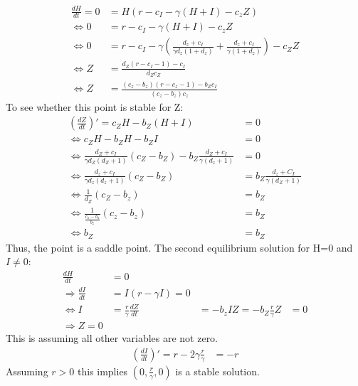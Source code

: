 \documentclass[
	12pt
]{article}
\begin{document}
			\begin{align*}
				\frac{dH}{dt} = 0 &= H(r-c_I-\gamma(H+I)-c_zZ) \\
				\Leftrightarrow 0&= r-c_I -\gamma (H+I)-c_z Z\\
				\Leftrightarrow 0 &= r-c_I - \gamma \left( \frac{d_z +c_I}{\gamma d_z(1+d_z)} +  \frac{d_z +c_I}{\gamma (1+d_z)} \right) - c_Z Z \\
				\Leftrightarrow Z &= \frac{d_Z(r-c_I-1)-c_I}{d_Z c_Z} \\
				\Leftrightarrow Z &= \frac{(c_z-b_z)(r-c_z-1)-b_Zc_I}{(c_z-b_z)c_z}
			\end{align*}
			To see whether this point is stable for Z:
			\begin{align*}
				\left(\frac{dZ}{dt}\right)'= c_Z H -b_Z(H+I) &= 0\\
				\Leftrightarrow c_Z H - b_Z H-b_ZI &= 0\\
				\Leftrightarrow \frac{d_Z+c_I}{\gamma d_Z(d_Z+1)}(c_Z-b_Z) - b_Z \frac{d_Z+c_I}{\gamma(d_z+1)} &= 0\\
				\Leftrightarrow \frac{d_z+c_I}{\gamma d_z(d_z+1)} (c_Z-b_Z) &= b_Z \frac{d_z+C_I}{\gamma (d_Z+1)}\\
				\Leftrightarrow \frac{1}{d_Z} (c_Z-b_z) &= b_Z\\
				\Leftrightarrow \frac{1}{\frac{c_z-b_z}{b_z}}(c_z-b_z) &= b_Z\\
				\Leftrightarrow b_Z &= b_Z 
			\end{align*}
			Thus, the point is a saddle point.
			The second equilibrium solution for H=0 and $I \neq 0$:
			\begin{align*}
				\frac{dH}{dt} &=0\\
				\Rightarrow \frac{dI}{dt} &= I(r-\gamma I) = 0 \\
				\Leftrightarrow I &= \frac{r}{\gamma}
				\frac{dZ}{dt} &= -b_z IZ = -b_Z\frac{r}{\gamma}Z &= 0 \\
				\Rightarrow Z = 0
			\end{align*}
			This is assuming all other variables are not zero.
			\begin{align*}
				\left(\frac{dI}{dt}\right)' = r- 2\gamma \frac{r}{\gamma} &= -r 
			\end{align*}
			Assuming $r>0$ this implies $\left(0,\frac{r}{\gamma}, 0\right)$ is a stable solution.
\end{document}

